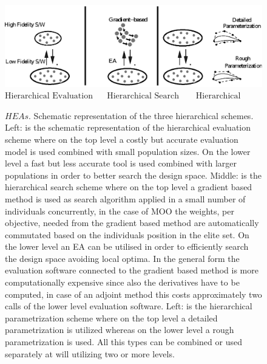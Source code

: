 \begin{figure}[h!]
    \centering
    \includegraphics[scale=0.8]{multimodes.eps}
    $\mbox{Hierarchical Evaluation~~~~~Hierarchical Search~~~~~~Hierarchical Parameterization}$
    \caption{$HEAs$. Schematic representation of the three
            hierarchical schemes. Left: is the schematic representation of the hierarchical evaluation scheme where on the top level a costly but accurate evaluation model is used combined with small population sizes. On the lower level a fast but less accurate tool is used combined with larger populations in order to better search the design space. Middle: is the hierarchical search scheme where on the top level a gradient based method is used as search algorithm applied in a small number of individuals concurrently, in the case of MOO the weights, per objective, needed from the gradient based method are automatically commutated  based on the individuals position in the elite set. On the lower level an EA can be utilised in order to efficiently search the design space avoiding local optima. In the general form the evaluation software connected to the gradient based method is more computationally expensive since also the derivatives have to be computed, in case of an adjoint method \cite{LTTVKI04b} this costs approximately two calls of the lower level evaluation software. Left: is the hierarchical parametrization scheme where on the top level a detailed parametrization is utilized whereas on the lower level a rough parametrization is used. All this types can be combined or used separately at will utilizing two or more levels.}
    \label{allheas}
\end{figure}      
